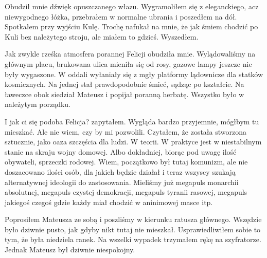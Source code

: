 Obudził mnie dźwięk opuszczanego włazu.
Wygramoliłem się z eleganckiego, acz niewygodnego łóżka, przebrałem w normalne ubrania i poszedłem na dół.
Spotkałem przy wyjściu Kulę.
Trochę nafukał na mnie, że jak śmiem chodzić po Kuli bez należytego stroju, ale miałem to gdzieś.
Wyszedłem.

Jak zwykle rześka atmosfera porannej Felicji obudziła mnie. 
Wylądowaliśmy na głównym placu, brukowana ulica mieniła się od rosy, gazowe lampy jeszcze nie były wygaszone.
W oddali wyłaniały się z mgły platformy lądownicze dla statków kosmicznych. Na jednej stał prawdopodobnie śmieć, sądząc po kształcie.
Na ławeczce obok siedział Mateusz i popijał poranną herbatę. 
Wszystko było w należytym porządku.
\begin{dialogue}
\ds{} I jak ci się podoba Felicja? \dm{} zapytałem.
\ds{} Wygląda bardzo przyjemnie, mógłbym tu mieszkać. Ale nie wiem, czy by mi pozwolili. Czytałem, że została stworzona sztucznie, jako oaza szczęścia dla ludzi.
\ds{} W teorii. W praktyce jest w niestabilnym stanie na skraju wojny domowej. Albo dokładniej, biorąc pod uwagę ilość obywateli, sprzeczki rodowej.
\ds{} Wiem, początkowo był tutaj komunizm, ale nie doszacowano ilości osób, dla jakich będzie działał i teraz wszyscy szukają alternatywnej ideologii do zastosowania.
\ds{} Mieliśmy już megapuls monarchii absolutnej, megapuls czystej demokracji, megapuls tyranii rasowej, megapuls jakiegoś czegoś gdzie każdy miał chodzić w aninimowej masce itp.
\end{dialogue}

Poprosiłem Mateusza ze sobą i poszliśmy w kierunku ratusza głównego.
Wszędzie było dziwnie pusto, jak gdyby nikt tutaj nie mieszkał. 
Usprawiedliwiłem sobie to tym, że była niedziela ranek.
Na wszelki wypadek trzymałem rękę na szyfratorze.
Jednak Mateusz był dziwnie niespokojny.

